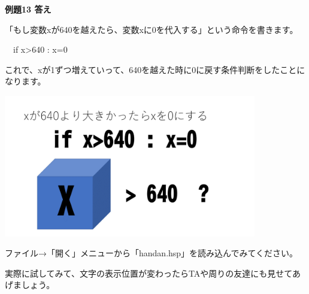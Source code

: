 \documentclass[a4paper,dvipdfmx]{jarticle}
\begin{document}
\bigskip

{\bfseries
例題13 答え}


\bigskip

「もし変数xが640を越えたら、変数xに0を代入する」という命令を書きます。


\bigskip

\ \ if x{\textgreater}640 : x=0


\bigskip

これで、xが1ずつ増えていって、640を越えた時に0に戻す条件判断をしたことになります。


\bigskip



\begin{center}
\includegraphics[width=11.033cm,height=6.209cm]{text02-img/text02-img052.png}

\end{center}

\bigskip


\bigskip


\bigskip


\bigskip


\bigskip


\bigskip


\bigskip


\bigskip


\bigskip


\bigskip


\bigskip


\bigskip


\bigskip


\bigskip


\bigskip

ファイル→「開く」メニューから「handan.hsp」を読み込んでみてください。

実際に試してみて、文字の表示位置が変わったらTAや周りの友達にも見せてあげましょう。


\bigskip
\end{document}
